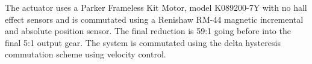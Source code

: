 The actuator uses a Parker Frameless Kit Motor, model K089200-7Y with no hall effect sensors and is commutated using a Renishaw RM-44 magnetic incremental and absolute position sensor.
The final reduction is 59:1 going before into the final 5:1 output gear.
The system is commutated using the delta hysteresis commutation scheme \cite{electric_machines} using velocity control.

